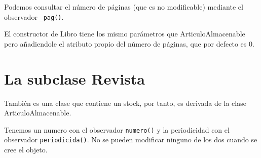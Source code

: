 Podemos consultar el número de páginas (que es no modificable) mediante el observador \texttt{\_pag()}.

El constructor de Libro tiene los mismo parámetros que ArticuloAlmacenable pero añadiendole el atributo propio del número de páginas, que por defecto es 0.

\section{La subclase Revista}

También es una clase que contiene un stock, por tanto, es derivada de la clase ArticuloAlmacenable.

Tenemos un numero con el observador \texttt{numero()} y la periodicidad con el observador \texttt{periodicida()}. No se pueden modificar ninguno de los dos cuando se cree el objeto.

